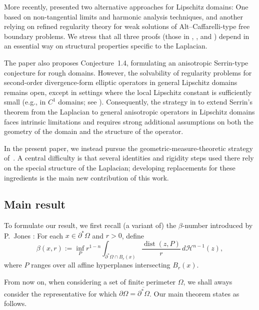 \documentclass[reqno,11pt]{amsart}
\def\dist{{\mathop\mathrm{dist}}}
\numberwithin{equation}{section}
\theoremstyle{remark}
\begin{document}
More recently, \cite{DZ2025,DR2026} presented two alternative approaches for Lipschitz domains: One based on non-tangential limits and harmonic analysis techniques, and another relying on refined regularity theory for weak solutions of Alt--Caffarelli-type free boundary problems. We stress that all three proofs (those in \cite{FZ2025}, \cite{DZ2025}, and \cite{DR2026}) depend in an essential way on structural properties specific to the Laplacian.



The paper \cite{DZ2025} also proposes Conjecture~1.4, formulating an anisotropic Serrin-type conjecture for rough domains. However, the solvability of regularity problems for second-order divergence-form elliptic operators in general Lipschitz domains remains open, except in settings where the local Lipschitz constant is sufficiently small (e.g., in $C^1$ domains; see \cite{DPR2017}). Consequently, the strategy in \cite{DZ2025} to extend Serrin's theorem from the Laplacian to general anisotropic operators in Lipschitz domains faces intrinsic limitations and requires strong additional assumptions on both the geometry of the domain and the structure of the operator.



In the present paper, we instead pursue the geometric-measure-theoretic strategy of~\cite{FZ2025}.
A central difficulty is that several identities and rigidity steps used there rely on the special
structure of the Laplacian; developing replacements for these ingredients is the main
new contribution of this work.



\subsection{Main result}
To formulate our result, we first recall (a variant of) the $\beta$-number introduced by P.\ Jones \cite{P1990}: For each $x\in \partial^*\Omega$ and $r>0$, define
\begin{equation}\label{beta ball}
\beta(x,r):=\inf_{P} r^{1-n}\int_{\partial^*\Omega\cap B_r(x)} \frac{\dist(z,P)}{r}\, d\mathscr H^{n-1}(z),
\end{equation}
where $P$ ranges over all affine hyperplanes intersecting $B_r(x)$.

From now on, when considering a set of finite perimeter $\Omega$, we shall aways consider the representative for which $\partial\Omega=\overline{\partial^*\Omega}$.
Our main theorem states as follows.
\end{document}
